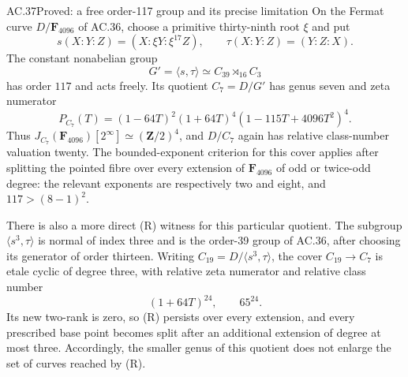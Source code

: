 \begin{claim}{AC.37}{Proved: a free order-117 group and its precise limitation}
On the Fermat curve \(D/\mathbf F_{4096}\) of AC.36,
choose a primitive thirty-ninth root \(\xi\) and put
\[
 s(X:Y:Z)=(X:\xi Y:\xi^{17}Z),
 \qquad \tau(X:Y:Z)=(Y:Z:X).
\]
The constant nonabelian group
\[
                 G'=\langle s,\tau\rangle
                    \simeq C_{39}\rtimes_{16}C_3
\]
has order \(117\) and acts freely. Its quotient \(C_7=D/G'\)
has genus seven and zeta numerator
\[
 P_{C_7}(T)=(1-64T)^2(1+64T)^4
                         (1-115T+4096T^2)^4.
\]
Thus \(J_{C_7}(\mathbf F_{4096})[2^\infty]
\simeq(\mathbf Z/2)^4\), and \(D/C_7\) again has relative
class-number valuation twenty.
The bounded-exponent criterion for this cover applies
after splitting the pointed fibre over every extension
of \(\mathbf F_{4096}\) of odd or twice-odd degree:
the relevant exponents are respectively two and eight,
and \(117>(8-1)^2\).

There is also a more direct (R) witness for this particular
quotient. The subgroup \(\langle s^3,\tau\rangle\) is
normal of index three and is the order-39 group of AC.36,
after choosing its generator of order thirteen.
Writing \(C_{19}=D/\langle s^3,\tau\rangle\), the cover
\(C_{19}\to C_7\) is etale cyclic of degree three, with
relative zeta numerator and relative class number
\[
                  (1+64T)^{24},\qquad 65^{24}.
\]
Its new two-rank is zero, so (R) persists over every
extension, and every prescribed base point becomes
split after an additional extension of degree at most
three. Accordingly, the smaller genus of this quotient
does not enlarge the set of curves reached by (R).
\end{claim}
